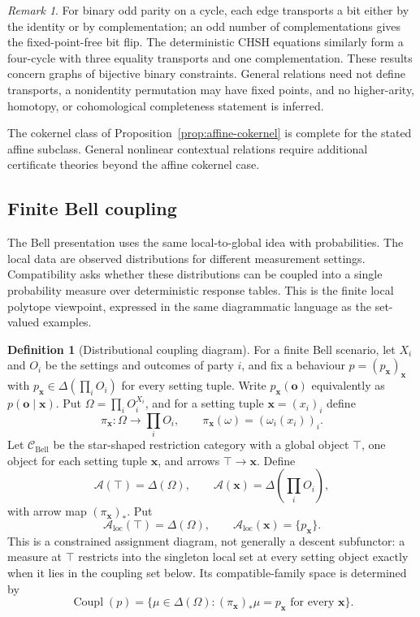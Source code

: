\documentclass[11pt]{article}
\theoremstyle{plain}
\theoremstyle{definition}
\newtheorem{definition}[theorem]{Definition}
\theoremstyle{remark}
\newtheorem{remark}[theorem]{Remark}
\newcommand{\LocalAdm}{\mathcal{A}_{\mathrm{loc}}}
\begin{document}
\begin{remark}
For binary odd parity on a cycle, each edge transports a bit either by the
identity or by complementation; an odd number of complementations gives the
fixed-point-free bit flip. The deterministic CHSH equations similarly form a
four-cycle with three equality transports and one complementation. These results
concern graphs of bijective binary constraints. General relations need not
define transports, a nonidentity permutation may have fixed points, and no
higher-arity, homotopy, or cohomological completeness statement is inferred.
\end{remark}

The cokernel class of Proposition~\ref{prop:affine-cokernel} is complete for the
stated affine subclass. General nonlinear contextual relations require
additional certificate theories beyond the affine cokernel case.

\subsection{Finite Bell coupling}

The Bell presentation uses the same local-to-global idea with probabilities.
The local data are observed distributions for different measurement settings.
Compatibility asks whether these distributions can be coupled into a single
probability measure over deterministic response tables. This is the finite local
polytope viewpoint, expressed in the same diagrammatic language as the set-valued
examples.

\begin{definition}[Distributional coupling diagram]\label{def:bellpack}
For a finite Bell scenario, let $X_i$ and $O_i$ be the settings and outcomes of
party $i$, and fix a behaviour $p=(p_{\mathbf x})_{\mathbf x}$ with
$p_{\mathbf x}\in\Delta(\prod_iO_i)$ for every setting tuple. Write
$p_{\mathbf x}(\mathbf o)$ equivalently as $p(\mathbf o\mid\mathbf x)$. Put
$\Omega=\prod_iO_i^{X_i}$, and for a setting tuple
$\mathbf x=(x_i)_i$ define
\[
\pi_{\mathbf x}:\Omega\to\prod_iO_i,
\qquad
\pi_{\mathbf x}(\omega)=(\omega_i(x_i))_i.
\]
Let $\mathcal C_{\mathrm{Bell}}$ be the star-shaped restriction category with a
global object $\top$, one object for each setting tuple $\mathbf x$, and arrows
$\top\to\mathbf x$. Define
\[
\mathcal A(\top)=\Delta(\Omega),
\qquad
\mathcal A(\mathbf x)=\Delta\!\left(\prod_iO_i\right),
\]
with arrow map $(\pi_{\mathbf x})_*$. Put
\[
\LocalAdm(\top)=\Delta(\Omega),
\qquad
\LocalAdm(\mathbf x)=\{p_{\mathbf x}\}.
\]
This is a constrained assignment diagram, not generally a descent subfunctor: a
measure at $\top$ restricts into the singleton local set at every setting object
exactly when it lies in the coupling set below. Its compatible-family space is
determined by
\[
\operatorname{Coupl}(p)=
\{\mu\in\Delta(\Omega):
(\pi_{\mathbf x})_*\mu=p_{\mathbf x}
\text{ for every }\mathbf x\}.
\]
\end{definition}
\end{document}
